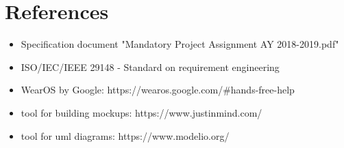 \chapter{References}

\begin{itemize}
\item Specification document "Mandatory Project Assignment AY 2018-2019.pdf"
\item ISO/IEC/IEEE 29148 - Standard on requirement engineering
\item WearOS by Google: https://wearos.google.com/\#hands-free-help
\item tool for building mockups: https://www.justinmind.com/
\item tool for uml diagrams: https://www.modelio.org/
\end{itemize}
